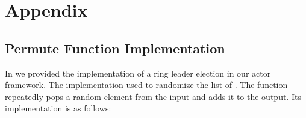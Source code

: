 \documentclass[sigplan,screen]{acmart}
\begin{document}
\appendix

\section{Appendix}

\subsection{Permute Function Implementation}
\label{apx:permute-impl}

In  we provided the implementation of a ring
leader election in our actor framework.
%
The implementation used  to randomize the list of
.
%
The  function repeatedly pops a random element from the input and adds it to the output.
%
Its implementation is as follows:
%
\end{document}
